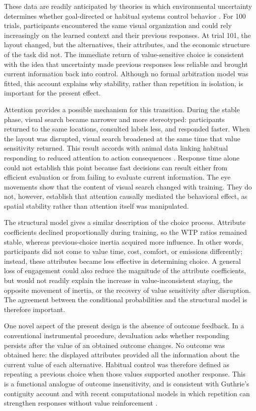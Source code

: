 \documentclass[man,natbib,floatsintext]{apa7}
\begin{document}
These data are readily anticipated by theories in which environmental uncertainty determines whether goal-directed or habitual systems control behavior \citep{daw2005, lee2014}. For 100 trials, participants encountered the same visual organization and could rely increasingly on the learned context and their previous responses. At trial 101, the layout changed, but the alternatives, their attributes, and the economic structure of the task did not. The immediate return of value-sensitive choice is consistent with the idea that uncertainty made previous responses less reliable and brought current information back into control. Although no formal arbitration model was fitted, this account explains why stability, rather than repetition in isolation, is important for the present effect.

Attention provides a possible mechanism for this transition. During the stable phase, visual search became narrower and more stereotyped: participants returned to the same locations, consulted labels less, and responded faster. When the layout was disrupted, visual search broadened at the same time that value sensitivity returned. This result accords with animal data linking habitual responding to reduced attention to action consequences \citep{thrailkill2018, bouton2020, bouton2024}. Response time alone could not establish this point because fast decisions can result either from efficient evaluation or from failing to evaluate current information. The eye movements show that the content of visual search changed with training. They do not, however, establish that attention causally mediated the behavioral effect, as spatial stability rather than attention itself was manipulated.

The structural model gives a similar description of the choice process. Attribute coefficients declined proportionally during training, so the WTP ratios remained stable, whereas previous-choice inertia acquired more influence. In other words, participants did not come to value time, cost, comfort, or emissions differently; instead, these attributes became less effective in determining choice. A general loss of engagement could also reduce the magnitude of the attribute coefficients, but would not readily explain the increase in value-inconsistent staying, the opposite movement of inertia, or the recovery of value sensitivity after disruption. The agreement between the conditional probabilities and the structural model is therefore important.

One novel aspect of the present design is the absence of outcome feedback. In a conventional instrumental procedure, devaluation asks whether responding persists after the value of an obtained outcome changes. No outcome was obtained here: the displayed attributes provided all the information about the current value of each alternative. Habitual control was therefore defined as repeating a previous choice when those values supported another response. This is a functional analogue of outcome insensitivity, and is consistent with Guthrie's contiguity account and with recent computational models in which repetition can strengthen responses without value reinforcement \citep{guthrie1935, millerHabits2019}.
\end{document}

